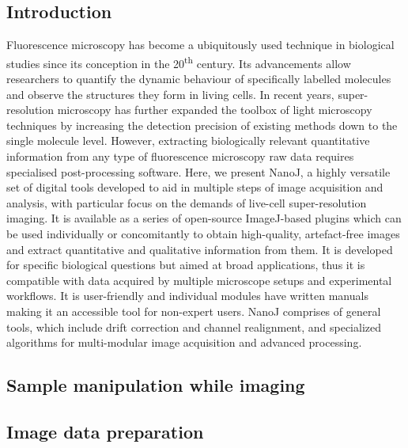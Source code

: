 \subsection*{Introduction}
  Fluorescence microscopy has become a ubiquitously used technique in biological studies since its conception in the 20\textsuperscript{th} century. Its advancements allow researchers to quantify the dynamic behaviour of specifically labelled molecules and observe the structures they form in living cells. In recent years, super-resolution microscopy has further expanded the toolbox of light microscopy techniques by increasing the detection precision of existing methods down to the single molecule level. However, extracting biologically relevant quantitative information from any type of fluorescence microscopy raw data requires specialised post-processing software.
  \newline
  Here, we present NanoJ, a highly versatile set of digital tools developed to aid in multiple steps of image acquisition and analysis, with particular focus on the demands of live-cell super-resolution imaging. It is available as a series of open-source ImageJ-based plugins which can be used individually or concomitantly to obtain high-quality, artefact-free images and extract quantitative and qualitative information from them. It is developed for specific biological questions but aimed at broad applications, thus it is compatible with data acquired by multiple microscope setups and experimental workflows. It is user-friendly and individual modules have written manuals making it an accessible tool for non-expert users.
  NanoJ comprises of general tools, which include drift correction and channel realignment, and specialized algorithms for multi-modular image acquisition and advanced processing.
  
\subsection*{Sample manipulation while imaging}
\Blindtext

\subsection*{Image data preparation}
\Blindtext

